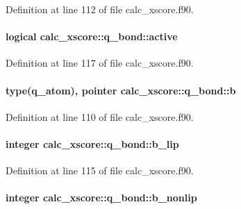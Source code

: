Definition at line 112 of file calc\-\_\-xscore.\-f90.

\hypertarget{structcalc__xscore_1_1q__bond_a6eb0f245aff0ac9b65972256a0685cdd}{
\paragraph[{active}]{\setlength{\rightskip}{0pt plus 5cm}logical calc\-\_\-xscore\-::q\-\_\-bond\-::active}}\label{structcalc__xscore_1_1q__bond_a6eb0f245aff0ac9b65972256a0685cdd}


Definition at line 117 of file calc\-\_\-xscore.\-f90.

\hypertarget{structcalc__xscore_1_1q__bond_a3afd307789bc19cc3bbb34ae8745125a}{
\paragraph[{b}]{\setlength{\rightskip}{0pt plus 5cm}type({\bf q\-\_\-atom}), pointer calc\-\_\-xscore\-::q\-\_\-bond\-::b}}\label{structcalc__xscore_1_1q__bond_a3afd307789bc19cc3bbb34ae8745125a}


Definition at line 110 of file calc\-\_\-xscore.\-f90.

\hypertarget{structcalc__xscore_1_1q__bond_aa8a2c3d549ed24b0921c400486659cb5}{
\paragraph[{b\-\_\-lip}]{\setlength{\rightskip}{0pt plus 5cm}integer calc\-\_\-xscore\-::q\-\_\-bond\-::b\-\_\-lip}}\label{structcalc__xscore_1_1q__bond_aa8a2c3d549ed24b0921c400486659cb5}


Definition at line 115 of file calc\-\_\-xscore.\-f90.

\hypertarget{structcalc__xscore_1_1q__bond_a0553a6f1f22c2f346427b596f16d2ec9}{
\paragraph[{b\-\_\-nonlip}]{\setlength{\rightskip}{0pt plus 5cm}integer calc\-\_\-xscore\-::q\-\_\-bond\-::b\-\_\-nonlip}}\label{structcalc__xscore_1_1q__bond_a0553a6f1f22c2f346427b596f16d2ec9}


